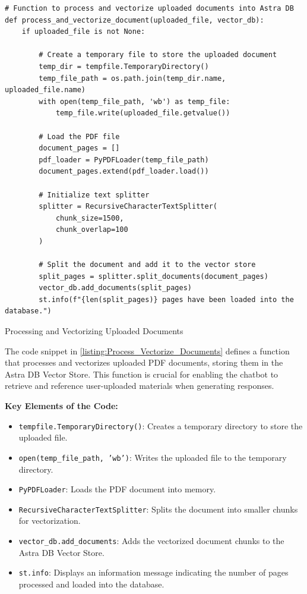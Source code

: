 \begin{listing}[H]
\begin{verbatim}
# Function to process and vectorize uploaded documents into Astra DB
def process_and_vectorize_document(uploaded_file, vector_db):
    if uploaded_file is not None:
        
        # Create a temporary file to store the uploaded document
        temp_dir = tempfile.TemporaryDirectory()
        temp_file_path = os.path.join(temp_dir.name, uploaded_file.name)
        with open(temp_file_path, 'wb') as temp_file:
            temp_file.write(uploaded_file.getvalue())

        # Load the PDF file
        document_pages = []
        pdf_loader = PyPDFLoader(temp_file_path)
        document_pages.extend(pdf_loader.load())

        # Initialize text splitter
        splitter = RecursiveCharacterTextSplitter(
            chunk_size=1500,
            chunk_overlap=100
        )

        # Split the document and add it to the vector store
        split_pages = splitter.split_documents(document_pages)
        vector_db.add_documents(split_pages)
        st.info(f"{len(split_pages)} pages have been loaded into the database.")
\end{verbatim}
\caption{Processing and Vectorizing Uploaded Documents}
\label{listing:Process_Vectorize_Documents}
\end{listing}

The code snippet in \ref{listing:Process_Vectorize_Documents} defines a function that processes and vectorizes uploaded PDF documents, storing them in the Astra DB Vector Store. This function is crucial for enabling the chatbot to retrieve and reference user-uploaded materials when generating responses.

\textbf{Key Elements of the Code:}
\begin{itemize}
    \item \texttt{tempfile.TemporaryDirectory()}: Creates a temporary directory to store the uploaded file.
    \item \texttt{open(temp\_file\_path, 'wb')}: Writes the uploaded file to the temporary directory.
    \item \texttt{PyPDFLoader}: Loads the PDF document into memory.
    \item \texttt{RecursiveCharacterTextSplitter}: Splits the document into smaller chunks for vectorization.
    \item \texttt{vector\_db.add\_documents}: Adds the vectorized document chunks to the Astra DB Vector Store.
    \item \texttt{st.info}: Displays an information message indicating the number of pages processed and loaded into the database.
\end{itemize}

